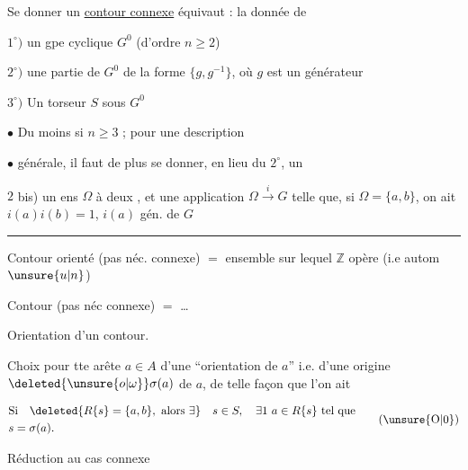 Se donner un \uline{contour connexe} équivaut : la donnée de

$1^{\circ})$ un gpe cyclique $G^{0}$ (d'ordre $n\geq2$)

$2^{\circ})$ une  partie de $G^{0}$  de la forme $\{g,g^{-1}\}$, où $g$ est un générateur 

$3^{\circ})$ Un torseur $S$ sous $G^{0}$

$\bullet$ Du moins si $n\geq3$  ; pour une description

$\bullet$ générale, il faut de plus se donner, en lieu du $2^{\circ}$, un

$2$ bis) un ens $\Omega$ à deux , et une application $\Omega\xrightarrow{i}G$ telle que, si $\Omega=\{a,b\}$, on ait $i(a)i(b)=1$, $i(a)$ gén. de $G$

\begin{center}\rule{1cm}{.35pt}\end{center}

Contour orienté (pas néc. connexe) $=$ ensemble sur lequel $\mathbb{Z}$ opère (i.e  autom $\unsure{u|n}$)

Contour (pas néc connexe) $=$ \ldots

Orientation d'un contour.

Choix pour tte arête $a\in A$ d'une ``orientation de $a$'' i.e. d'une origine $\deleted{\unsure{o|\omega}}\sigma(a)$ de $a$, de telle façon que l'on ait


\[
\begin{aligned}
&\text{Si}\quad \deleted{R\{s\}=\{a,b\},\ \text{alors }\exists}\quad s\in S,\quad \exists1\ a\in R\{s\}\ \text{tel que}\\
&s=\sigma(a).
\end{aligned}\tag*{(\unsure{O|0})}
\]

Réduction au cas connexe


